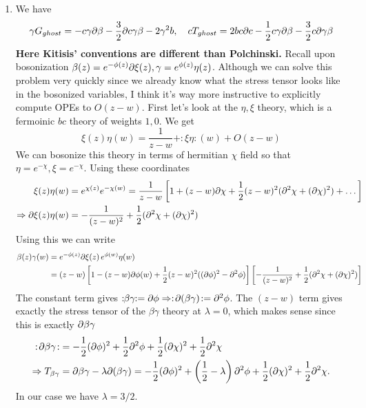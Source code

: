 \documentclass[11pt, class=article, crop=false]{standalone}
\begin{document}
\begin{enumerate}
	\item We have
	\[
		\gamma G_{ghost} = -c \gamma \partial \beta - \frac32 \partial c \gamma \beta - 2 \gamma^2 b, \quad c T_{ghost} = 2 b c \partial c - \frac12 c \gamma \partial \beta - \frac32 c \partial \gamma \beta
	\]
	\textbf{Here Kitisis' conventions are different than Polchinski.} Recall upon bosonization $\beta(z) = e^{-\phi(z)} \partial \xi(z), \gamma = e^{\phi(z)} \eta(z)$. 
	Although we can solve this problem very quickly since we already know what the stress tensor looks like in the bosonized variables, I think it's way more instructive to explicitly compute OPEs to $O(z-w)$. First let's look at the $\eta, \xi$ theory, which is a fermoinic $bc$ theory of weights $1, 0$. We get
	\[
		\xi(z) \eta(w) = \frac{1}{z-w} + :\xi \eta:(w) + O(z-w)
	\]
	We can bosonize this theory in terms of hermitian $\chi$ field so that $\eta = e^{-\chi}, \xi = e^{-\chi}$. Using these coordinates
	\[
	\begin{aligned}
		\xi(z) \eta(w) &= e^{\chi(z)} e^{-\chi(w)} = \frac{1}{z-w} \left[1 + (z-w) \partial \chi + \frac12 (z-w)^2 (\partial^2 \chi + (\partial \chi)^2)  + \dots \right]\\
		\Rightarrow \partial \xi(z) \eta(w) &= -\frac{1}{(z-w)^2} + \frac12 (\partial^2 \chi + (\partial \chi)^2)
	\end{aligned}
	\]
	Using this we can write
	\[
	\begin{aligned}
		\beta(z) \gamma(w) &= e^{-\phi(z)} \partial \xi(z) \, e^{\phi(w)} \eta(w) \\
		&= (z-w) \left[1 - (z-w) \partial \phi(w) + \frac12 (z-w)^2 ((\partial\phi)^2 - \partial^2 \phi) \right] \left[-\frac{1}{(z-w)^2} + \frac12 (\partial^2 \chi + (\partial \chi)^2) \right]
	\end{aligned}
	\]
	The constant term gives $:\!\!\beta \gamma\!\!: = \partial \phi \Rightarrow :\!\partial(\beta \gamma)\!: = \partial^2 \phi$. The $(z-w)$ term gives exactly the stress tensor of the $\beta \gamma$ theory at $\lambda = 0$, which makes sense since this is exactly $\partial \beta \gamma$
	\[
	\begin{aligned}
		:\!\partial \beta \gamma\!: &= -\frac12 (\partial \phi)^2 + \frac12 \partial^2 \phi + \frac12 (\partial\chi)^2 + \frac12 \partial^2 \chi\\
		\Rightarrow 	T_{\beta \gamma } &= \partial \beta \gamma - \lambda \partial(\beta \gamma) = -\frac12 (\partial \phi)^2 + \left(\frac12 - \lambda\right) \partial^2 \phi + \frac12 (\partial\chi)^2 + \frac12 \partial^2 \chi.
	\end{aligned}
	\]
	In our case we have $\lambda = 3/2$. %
	\[
	\begin{aligned}

\end{aligned}\]
\end{enumerate}
\end{document}
